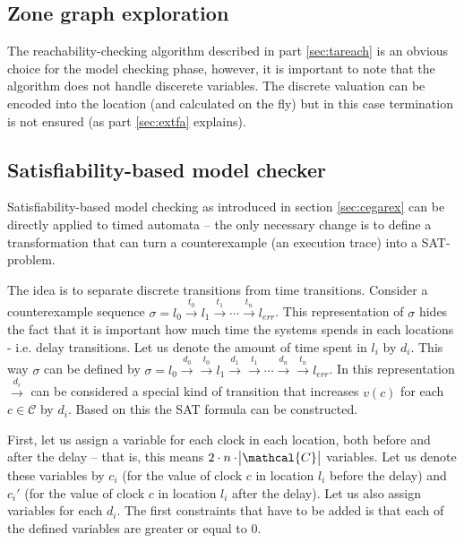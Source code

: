 
\subsection{Zone graph exploration} 

The reachability-checking algorithm described in part \ref{sec:tareach} is an obvious choice for the model checking phase, however, it is important to note that the algorithm does not handle discerete variables. The discrete valuation can be encoded into the location (and calculated on the fly) but in this case termination is not ensured (as part \ref{sec:extfa} explains).

\subsection{Satisfiability-based model checker}\label{sec:satmc}

Satisfiability-based model checking as introduced in section \ref{sec:cegarex} can be directly applied to timed automata -- the only necessary change is to define a transformation that can turn a counterexample (an execution trace) into a SAT-problem.

The idea is to separate discrete transitions from time transitions. Consider a counterexample sequence $\sigma = l_0 \xrightarrow{t_0} l_1 \xrightarrow{t_1} \cdots \xrightarrow{t_n} l_{err}$.  This representation of $\sigma$ hides the fact that it is important how much time the systems spends in each locations - i.e. delay transitions. Let us denote the amount of time spent in $l_i$ by $d_i$. This way $\sigma$ can be defined by $\sigma = l_0 \xrightarrow{d_0} \xrightarrow{t_0} l_1 \xrightarrow{d_1} \xrightarrow{t_1} \cdots \xrightarrow{d_n} \xrightarrow{t_n} l_{err}$. In this representation $\xrightarrow{d_i}$ can be considered a special kind of transition that increases $v(c)$ for each $c \in \mathcal{C}$ by $d_i$. Based on this the SAT formula can be constructed.

First, let us assign a variable for each clock in each location, both before and after the delay -- that is, this means $2\cdot n \cdot \abs{\mathcal{C}}$ variables. Let us denote these variables by $c_i$ (for the value of clock $c$ in location $l_i$ before the delay) and $c_i'$ (for the value of clock $c$ in location $l_i$ after the delay). Let us also assign variables for each $d_i$. The first constraints that have to be added is that each of the defined variables are greater or equal to 0.

